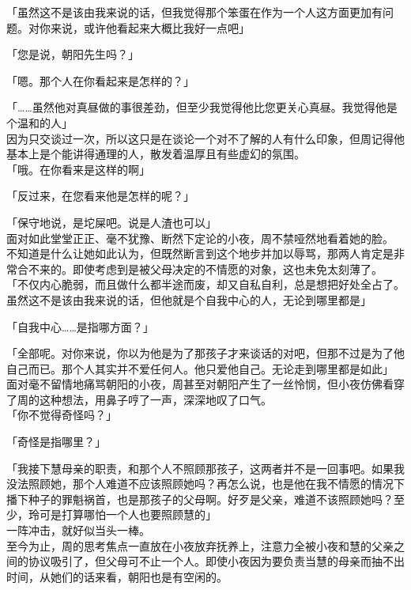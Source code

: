 「虽然这不是该由我来说的话，但我觉得那个笨蛋在作为一个人这方面更加有问题。对你来说，或许他看起来大概比我好一点吧」

「您是说，朝阳先生吗？」

「嗯。那个人在你看起来是怎样的？」

「……虽然他对真昼做的事很差劲，但至少我觉得他比您更关心真昼。我觉得他是个温和的人」\\

因为只交谈过一次，所以这只是在谈论一个对不了解的人有什么印象，但周记得他基本上是个能讲得通理的人，散发着温厚且有些虚幻的氛围。\\

「哦。在你看来是这样的啊」

「反过来，在您看来他是怎样的呢？」

「保守地说，是坨屎吧。说是人渣也可以」\\

面对如此堂堂正正、毫不犹豫、断然下定论的小夜，周不禁哑然地看着她的脸。\\

不知道是什么让她如此认为，但既然断言到这个地步并加以辱骂，那两人肯定是非常合不来的。即使考虑到是被父母决定的不情愿的对象，这也未免太刻薄了。\\

「不仅内心脆弱，而且做什么都半途而废，却又自私自利，总是想把好处全占了。虽然这不是该由我来说的话，但他就是个自我中心的人，无论到哪里都是」

「自我中心……是指哪方面？」

「全部呢。对你来说，你以为他是为了那孩子才来谈话的对吧，但那不过是为了他自己而已。那个人其实并不爱任何人。他只爱他自己。无论走到哪里都是如此」\\

面对毫不留情地痛骂朝阳的小夜，周甚至对朝阳产生了一丝怜悯，但小夜仿佛看穿了周的这种想法，用鼻子哼了一声，深深地叹了口气。\\

「你不觉得奇怪吗？」

「奇怪是指哪里？」

「我接下慧母亲的职责，和那个人不照顾那孩子，这两者并不是一回事吧。如果我没法照顾她，那个人难道不应该照顾她吗？再怎么说，也是他在我不情愿的情况下播下种子的罪魁祸首，也是那孩子的父母啊。好歹是父亲，难道不该照顾她吗？至少，玲可是打算哪怕一个人也要照顾慧的」\\

一阵冲击，就好似当头一棒。\\

至今为止，周的思考焦点一直放在小夜放弃抚养上，注意力全被小夜和慧的父亲之间的协议吸引了，但父母可不止一个人。即使小夜因为要负责当慧的母亲而抽不出时间，从她们的话来看，朝阳也是有空闲的。\\

